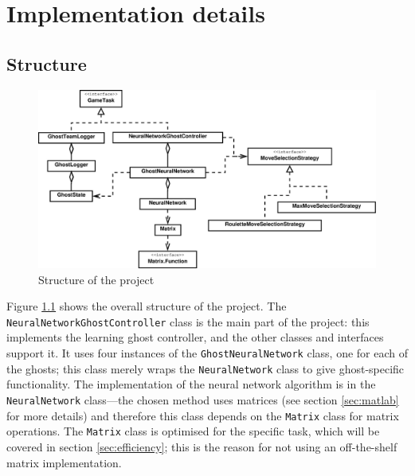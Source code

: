 \chapter{Implementation details}
\label{ch:implementation}

\section{Structure}
\label{sec:structure}

\begin{figure}
\includegraphics[width=\linewidth]{diagrams/project2}
\caption{Structure of the project}
\label{fig:project}
\end{figure}

Figure \ref{fig:project} shows the overall structure of the project.  The {\tt NeuralNetworkGhostController} class is the main part of the project: this implements the learning ghost controller, and the other classes and interfaces support it.  It uses four instances of the {\tt GhostNeuralNetwork} class, one for each of the ghosts; this class merely wraps the {\tt NeuralNetwork} class to give ghost-specific functionality.  The implementation of the neural network algorithm is in the {\tt NeuralNetwork} class---the chosen method uses matrices (see section \ref{sec:matlab} for more details) and therefore this class depends on the {\tt Matrix} class for matrix operations.  The {\tt Matrix} class is optimised for the specific task, which will be covered in section \ref{sec:efficiency}; this is the reason for not using an off-the-shelf matrix implementation.

